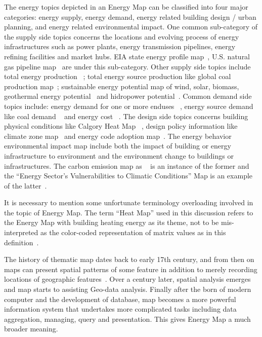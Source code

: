 \documentclass[hidelinks,12pt]{article}
\begin{document}
The energy topics depicted in an Energy Map can be classified into
four major categories: energy supply, energy demand, energy related
building design / urban planning, and energy related environmental
impact. One common sub-category of the supply side topics concerns the
locations and evolving process of energy infrastructures such as power
plants, energy transmission pipelines, energy refining facilities and
market hubs. EIA state energy profile map~\cite{EIAProfile2015},
U.S. natural gas pipeline map~\cite{EIAGaspipe} are under this
sub-category. Other supply side topics include total energy production
~\cite{DOEEnergyProduct}; total energy source production like global
coal production map~\cite{EIACoalProduct}; sustainable energy
potential map of wind, solar, biomass, geothermal energy
potential~\cite{NRELMap2015} and hidropower
potential~\cite{DOEHydro}. Common demand side topics include: energy
demand for one or more enduses ~\cite{heatMap2012}, energy source
demand like coal demand ~\cite{EIACoalDemand} and energy cost
~\cite{DOEEnergyCost}. The design side topics concerns building
physical conditions like Calgory Heat Map ~\cite{Hay2011}, design
policy information like climate zone map~\cite{IECCClimate} and energy
code adoption map~\cite{CodeAdopt}. The energy behavior environmental
impact map include both the impact of building or energy
infrastructure to environment and the environment change to buildings
or infrastructures. The carbon emission map as ~\cite{CO2Atlas} is an
instance of the former and the ``Energy Sector's Vulnerabilities to
Climatic Conditions'' Map is an example of the
latter~\cite{DOEVulner}.

It is necessary to mention some unfortunate terminology overloading
involved in the topic of Energy Map. The term ``Heat Map'' used in
this discussion refers to the Energy Map with building heating energy
as its theme, not to be mis-interpreted as the color-coded
representation of matrix values as in this
definition~\cite{HeatmapWiki}.

The history of thematic map dates back to early 17th century, and from
then on maps can present spatial patterns of some feature in addition
to merely recording locations of geographic
features~\cite{ThematicMap}. Over a century later, spatial analysis
emerges and map starts to assisting Geo-data analysis. Finally after
the born of modern computer and the development of database, map
becomes a more powerful information system that undertakes more
complicated tasks including data aggregation, managing, query and
presentation. This gives Energy Map a much broader meaning.
\end{document}
